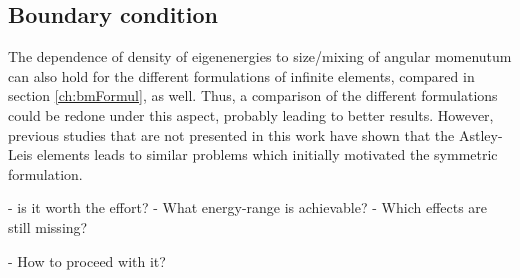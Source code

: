 
\subsection{Boundary condition}
The dependence of density of eigenenergies to size/mixing of angular momenutum can also hold for the different formulations of infinite elements, compared in section \ref{ch:bmFormul}, as well.
Thus, a comparison of the different formulations could be redone under this aspect, probably leading to better results.
However, previous studies that are not presented in this work have shown that the Astley-Leis elements leads to similar problems which initially motivated the symmetric formulation.

 - is it worth the effort?
 - What energy-range is achievable?
 - Which effects are still missing?

 - How to proceed with it?
